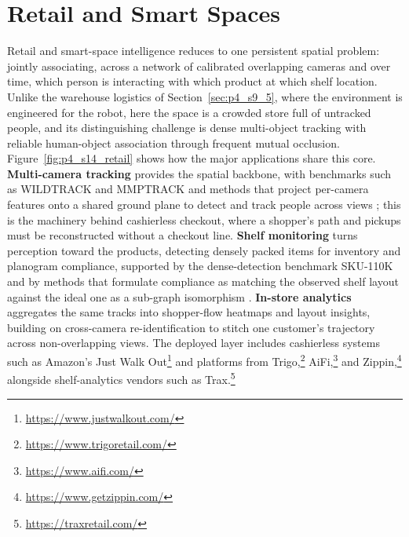 \section{Retail and Smart Spaces}
\label{sec:part-4-section-14-retail-and-smart-spaces}

Retail and smart-space intelligence reduces to one persistent spatial problem: jointly associating, across a network of calibrated overlapping cameras and over time, which person is interacting with which product at which shelf location. 
Unlike the warehouse logistics of Section~\ref{sec:p4_s9_5}, where the environment is engineered for the robot, here the space is a crowded store full of untracked people, and its distinguishing challenge is dense multi-object tracking with reliable human-object association through frequent mutual occlusion.
Figure~\ref{fig:p4_s14_retail} shows how the major applications share this core. 
\textbf{Multi-camera tracking} provides the spatial backbone, with benchmarks such as WILDTRACK \cite{chavdarova2018wildtrack} and MMPTRACK \cite{han2023mmptrack} and methods that project per-camera features onto a shared ground plane to detect and track people across views \cite{hou2020multiview}; this is the machinery behind cashierless checkout, where a shopper's path and pickups must be reconstructed without a checkout line. 
\textbf{Shelf monitoring} turns perception toward the products, detecting densely packed items for inventory and planogram compliance, supported by the dense-detection benchmark SKU-110K \cite{goldman2019precise} and by methods that formulate compliance as matching the observed shelf layout against the ideal one as a sub-graph isomorphism \cite{tonioni2017product}. 
\textbf{In-store analytics} aggregates the same tracks into shopper-flow heatmaps and layout insights, building on cross-camera re-identification \cite{zheng2015scalable} to stitch one customer's trajectory across non-overlapping views.
The deployed layer includes cashierless systems such as Amazon's Just Walk Out\footnote{\url{https://www.justwalkout.com/}} and platforms from Trigo,\footnote{\url{https://www.trigoretail.com/}} AiFi,\footnote{\url{https://www.aifi.com/}} and Zippin,\footnote{\url{https://www.getzippin.com/}} alongside shelf-analytics vendors such as Trax.\footnote{\url{https://traxretail.com/}}


